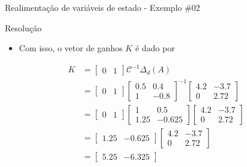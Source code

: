 \begin{frame}{Realimentação de variáveis de estado - Exemplo \#02}
\begin{block}{Resolução}
\begin{itemize}
    \item Com isso, o vetor de ganhos $K$ é dado por
\end{itemize}
\begin{align*}
    K &= \begin{bmatrix}
    0 & 1
    \end{bmatrix} \mathcal{C}^{-1}\Delta_d(A) \\
    &= \begin{bmatrix}
    0 & 1
    \end{bmatrix} \begin{bmatrix} \num{0,5} & \num{0,4} \\ 1 & -\num{0,8} \end{bmatrix}^{-1} \begin{bmatrix}
    \num{4,2} & -\num{3,7} \\ 0 & \num{2,72}
    \end{bmatrix} \\
    &= \begin{bmatrix}
    0 & 1
    \end{bmatrix} \begin{bmatrix} 1 & \num{0,5} \\ \num{1,25} & -\num{0,625} \end{bmatrix} \begin{bmatrix}
    \num{4,2} & -\num{3,7} \\ 0 & \num{2,72}
    \end{bmatrix} \\
    &= \begin{bmatrix}
    \num{1,25} & -\num{0,625}
    \end{bmatrix}
    \begin{bmatrix}
    \num{4,2} & -\num{3,7} \\ 0 & \num{2,72}
    \end{bmatrix} \\
    &= \begin{bmatrix}
    \num{5,25} & -\num{6,325}
    \end{bmatrix}
\end{align*}
\end{block}
\end{frame}

